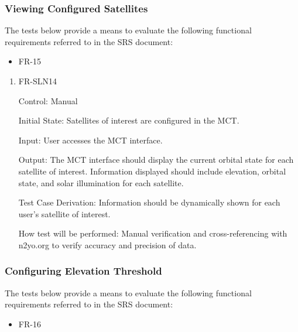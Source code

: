\documentclass[12pt, titlepage]{article}
\begin{document}
\subsubsection{Viewing Configured Satellites}

The tests below provide a means to evaluate the following functional requirements referred to in the SRS document:
\begin{itemize}
    \item FR-15
\end{itemize}

\begin{enumerate}

\item{FR-SLN14\\}

Control: Manual
					
Initial State: Satellites of interest are configured in the MCT.
	
Input: User accesses the MCT interface.
					
Output: The MCT interface should display the current orbital state for each satellite of interest. Information displayed should include elevation, orbital state, and solar illumination for each satellite.

Test Case Derivation: Information should be dynamically shown for each user's satellite of interest.
					
How test will be performed: Manual verification and cross-referencing with n2yo.org to verify accuracy and precision of data.

\end{enumerate}


\subsubsection{Configuring Elevation Threshold}

The tests below provide a means to evaluate the following functional requirements referred to in the SRS document:
\begin{itemize}
    \item FR-16
\end{itemize}
\end{document}
